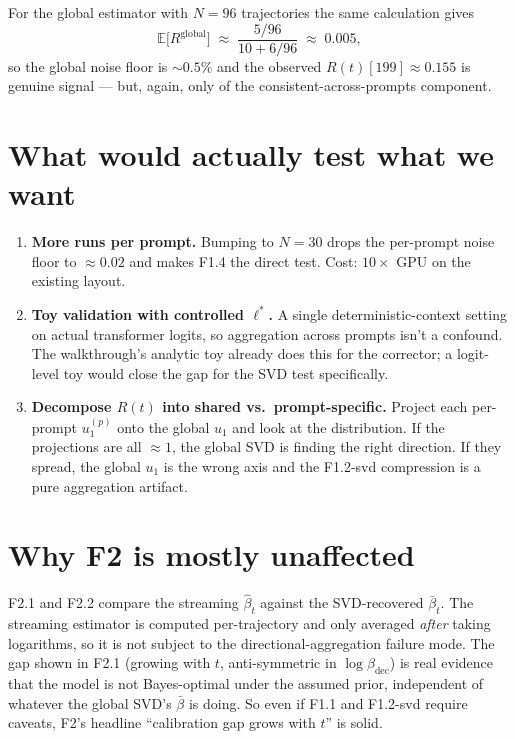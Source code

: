\documentclass[11pt]{article}
\newcommand{\Rt}{R(t)}
\newcommand{\lstar}{\ell^{*}}
\newcommand{\bhat}{\hat\beta}
\newcommand{\bbar}{\bar\beta}
\begin{document}
For the global estimator with \(N=96\) trajectories the same calculation gives
\[
\mathbb{E}\bigl[R^{\text{global}}\bigr]
\;\approx\;
\frac{5/96}{10 + 6/96}
\;\approx\;
0.005,
\]
so the global noise floor is \(\sim 0.5\%\) and the observed \(\Rt[199]\approx 0.155\) is genuine signal ---
but, again, only of the consistent-across-prompts component.

\section{What would actually test what we want}

\begin{enumerate}[leftmargin=2em]
\item \textbf{More runs per prompt.}
Bumping to \(N=30\) drops the per-prompt noise floor to \(\approx 0.02\) and makes F1.4 the direct test.
Cost: \(10\times\) GPU on the existing layout.

\item \textbf{Toy validation with controlled \(\lstar\).}
A single deterministic-context setting on actual transformer logits, so aggregation across prompts isn't a confound.
The walkthrough's analytic toy already does this for the corrector;
a logit-level toy would close the gap for the SVD test specifically.

\item \textbf{Decompose \(\Rt\) into shared vs.\ prompt-specific.}
Project each per-prompt \(u_1^{(p)}\) onto the global \(u_1\) and look at the distribution.
If the projections are all \(\approx 1\), the global SVD is finding the right direction.
If they spread, the global \(u_1\) is the wrong axis and the F1.2-svd compression is a pure aggregation artifact.
\end{enumerate}

\section{Why F2 is mostly unaffected}

F2.1 and F2.2 compare the streaming \(\bhat_t\) against the SVD-recovered \(\bbar_t\).
The streaming estimator is computed per-trajectory and only averaged \emph{after} taking logarithms,
so it is not subject to the directional-aggregation failure mode.
The gap shown in F2.1 (growing with \(t\), anti-symmetric in \(\log\beta_{\text{dec}}\)) is real evidence
that the model is not Bayes-optimal under the assumed prior,
independent of whatever the global SVD's \(\bbar\) is doing.
So even if F1.1 and F1.2-svd require caveats,
F2's headline ``calibration gap grows with \(t\)'' is solid.
\end{document}
